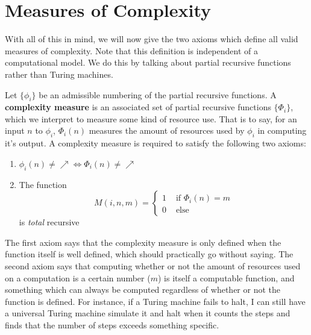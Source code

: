 \section{Measures of Complexity}
\par With all of this in mind, we will now give the two axioms which define all valid measures of complexity. Note that this definition is independent of a computational model. We do this by talking about partial recursive functions rather than Turing machines. 
\begin{definition}
    Let $\{\phi_i\}$ be an admissible numbering of the partial recursive functions. A \textbf{complexity measure} is an associated set of partial recursive functions $\{\Phi_i\}$, which we interpret to measure some kind of resource use. That is to say, for an input $n$ to $\phi_i$, $\Phi_i(n)$ measures the amount of resources used by $\phi_i$ in computing it's output. A complexity measure is required to satisfy the following two axioms:
    \begin{enumerate}
        \item $\phi_i(n) \neq \nearrow \iff \Phi_i(n) \neq \nearrow$
        \item The function
        \[ M(i,n,m) = \begin{cases}
                          1 & \textrm{ if $\Phi_i(n)=m$} \\
                          0 & \textrm{ else}
                      \end{cases}\]
        is \textit{total} recursive
    \end{enumerate}
\end{definition}
\par The first axiom says that the complexity measure is only defined when the function itself is well defined, which should practically go without saying. The second axiom says that computing whether or not the amount of resources used on a computation is a certain number ($m$) is itself a computable function, and something which can always be computed regardless of whether or not the function is defined. For instance, if a Turing machine fails to halt, I can still have a universal Turing machine simulate it and halt when it counts the steps and finds that the number of steps exceeds something specific.
